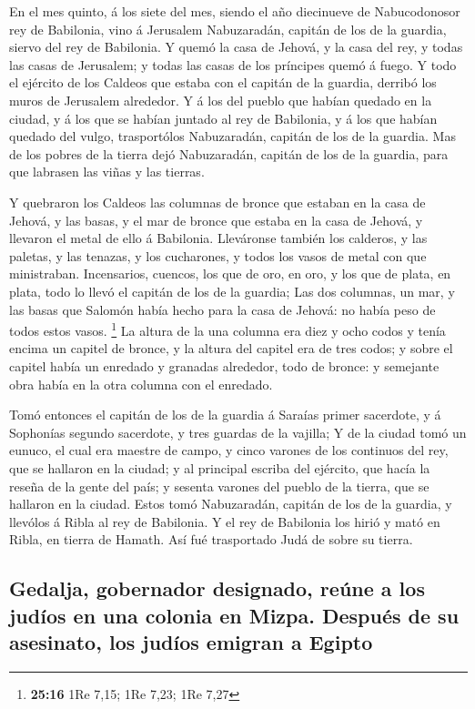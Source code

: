  En el mes quinto, á los siete del mes, siendo el año
diecinueve de Nabucodonosor rey de Babilonia, vino á Jerusalem
Nabuzaradán, capitán de los de la guardia, siervo del rey de Babilonia.
 Y quemó la casa de Jehová, y la casa del rey, y todas las
casas de Jerusalem; y todas las casas de los príncipes quemó á fuego.
 Y todo el ejército de los Caldeos que estaba con el
capitán de la guardia, derribó los muros de Jerusalem alrededor.
 Y á los del pueblo que habían quedado en la ciudad, y á
los que se habían juntado al rey de Babilonia, y á los que habían
quedado del vulgo, trasportólos Nabuzaradán, capitán de los de la
guardia.  Mas de los pobres de la tierra dejó Nabuzaradán,
capitán de los de la guardia, para que labrasen las viñas y las tierras.

 Y quebraron los Caldeos las columnas de bronce que estaban
en la casa de Jehová, y las basas, y el mar de bronce que estaba en la
casa de Jehová, y llevaron el metal de ello á Babilonia. 
Lleváronse también los calderos, y las paletas, y las tenazas, y los
cucharones, y todos los vasos de metal con que ministraban.
 Incensarios, cuencos, los que de oro, en oro, y los que de
plata, en plata, todo lo llevó el capitán de los de la guardia;
 Las dos columnas, un mar, y las basas que Salomón había
hecho para la casa de Jehová: no había peso de todos estos vasos.
\footnote{\textbf{25:16} 1Re 7,15; 1Re 7,23; 1Re 7,27}  La
altura de la una columna era diez y ocho codos y tenía encima un capitel
de bronce, y la altura del capitel era de tres codos; y sobre el capitel
había un enredado y granadas alrededor, todo de bronce: y semejante obra
había en la otra columna con el enredado.

 Tomó entonces el capitán de los de la guardia á Saraías
primer sacerdote, y á Sophonías segundo sacerdote, y tres guardas de la
vajilla;  Y de la ciudad tomó un eunuco, el cual era
maestre de campo, y cinco varones de los continuos del rey, que se
hallaron en la ciudad; y al principal escriba del ejército, que hacía la
reseña de la gente del país; y sesenta varones del pueblo de la tierra,
que se hallaron en la ciudad.  Estos tomó Nabuzaradán,
capitán de los de la guardia, y llevólos á Ribla al rey de Babilonia.
 Y el rey de Babilonia los hirió y mató en Ribla, en tierra
de Hamath. Así fué trasportado Judá de sobre su tierra.

\hypertarget{gedalja-gobernador-designado-reuxfane-a-los-juduxedos-en-una-colonia-en-mizpa.-despuuxe9s-de-su-asesinato-los-juduxedos-emigran-a-egipto}{%
\subsection{Gedalja, gobernador designado, reúne a los judíos en una
colonia en Mizpa. Después de su asesinato, los judíos emigran a
Egipto}\label{gedalja-gobernador-designado-reuxfane-a-los-juduxedos-en-una-colonia-en-mizpa.-despuuxe9s-de-su-asesinato-los-juduxedos-emigran-a-egipto}}

